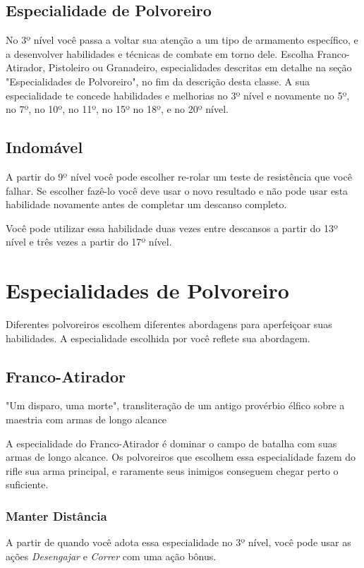 \documentclass[letterpaper,twocolumn,openany]{dndbook}
\begin{document}
	\subsection{Especialidade de Polvoreiro}
	No 3º nível você passa a voltar sua atenção a um tipo de armamento específico, e a desenvolver habilidades e técnicas de combate em torno dele. Escolha Franco-Atirador, Pistoleiro ou Granadeiro, especialidades descritas em detalhe na seção "Especialidades de Polvoreiro", no fim da descrição desta classe. A sua especialidade te concede habilidades e melhorias no 3º nível e novamente no 5º, no 7º, no 10º, no 11º, no 15º no 18º, e no 20º nível.
	
	\subsection{Indomável}
	A partir do 9º nível você pode escolher re-rolar um teste de resistência que você falhar. Se escolher fazê-lo você deve usar o novo resultado e não pode usar esta habilidade novamente antes de completar um descanso completo.
	\par Você pode utilizar essa habilidade duas vezes entre descansos a partir do 13º nível e três vezes a partir do 17º nível.
	
	\section{Especialidades de Polvoreiro}
	Diferentes polvoreiros escolhem diferentes abordagens para aperfeiçoar suas habilidades. A especialidade escolhida por você reflete sua abordagem.
	
	\subsection{Franco-Atirador}
	\begin{quotebox}
		"Um disparo, uma morte", transliteração de um antigo provérbio élfico sobre a maestria com armas de longo alcance
	\end{quotebox}
	A especialidade do Franco-Atirador é dominar o campo de batalha com suas armas de longo alcance. Os polvoreiros que escolhem essa especialidade fazem do rifle sua arma principal, e raramente seus inimigos conseguem chegar perto o suficiente.
	
	\subsubsection{Manter Distância}
	A partir de quando você adota essa especialidade no 3º nível, você pode usar as ações \textit{Desengajar} e \textit{Correr} com uma ação bônus.
	
\end{document}
